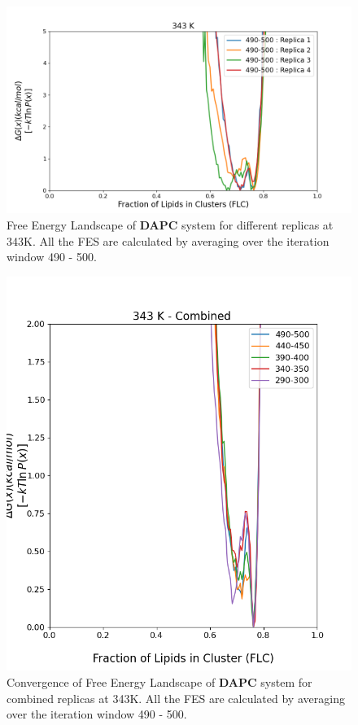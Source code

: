 \documentclass{biophys-new}
\begin{document}

\begin{figure}[hbt!]
\centering
\includegraphics[width=1.1\linewidth]{all_plots/ClusterLipids2Total/DPPC_DAPC_CHOL/343K/Average_DAPC_343_ClusterLipids2Total.png}
\caption{Free Energy Landscape of \textbf{DAPC} system for different replicas at 343K. All the FES are calculated by averaging over the iteration window 490 - 500.}
\label{fig:view}

\end{figure}

\begin{figure}[hbt!]
\centering
\includegraphics[width=0.6\linewidth]{all_plots/ClusterLipids2Total/DPPC_DAPC_CHOL/343K/Convergence_DAPC_MULTI__343_ClusterLipids2Total.png}
\caption{Convergence of Free Energy Landscape of \textbf{DAPC} system for combined replicas at 343K. All the FES are calculated by averaging over the iteration window 490 - 500.}
\label{fig:view}

\end{figure}
\end{document}
